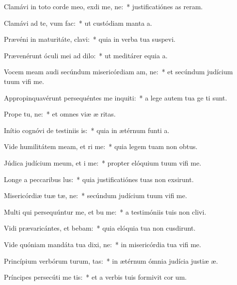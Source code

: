 \item Clamávi in toto corde meo, exdi me, ne:~* justificatiónes as reram.
\item Clamávi ad te, vum  fac:~* ut custódiam manta a.
\item Prævéni in maturitáte,  clavi:~* quia in verba tua suspevi.
\item Prævenérunt óculi mei ad  dilo:~* ut meditárer equia a.
\item Vocem meam audi secúndum misericórdiam am, ne:~* et secúndum judícium tuum vifi me.
\item Appropinquavérunt persequéntes me inquiti:~* a lege autem tua ge ti sunt.
\item Prope  tu, ne:~* et omnes viæ æ ritas.
\item Inítio cognóvi de testiniis is:~* quia in ætérnum funti a.
\item Vide humilitátem meam, et ri me:~* quia legem tuam non  obtus.
\item Júdica judícium meum, et i me:~* propter elóquium tuum vifi me.
\item Longe a peccaribus lus:~* quia justificatiónes tuas non exsirunt.
\item Misericórdiæ tuæ tæ, ne:~* secúndum judícium tuum vifi me.
\item Multi qui persequúntur me, et bu me:~* a testimóniis tuis non clivi.
\item Vidi prævaricántes, et bebam:~* quia elóquia tua non cusdirunt.
\item Vide quóniam mandáta tua dixi, ne:~* in misericórdia tua vifi me.
\item Princípium verbórum turum, tas:~* in ætérnum ómnia judícia justiæ æ.
\item Príncipes persecúti  me tis:~* et a verbis tuis formivit cor um.
